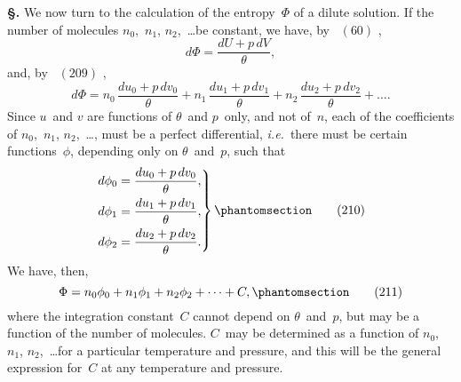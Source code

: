 \documentclass[12pt]{book}[2005/09/16]
\newcommand{\Chg}[2]{#2}
\newcommand{\Add}[1]{\Chg{}{#1}}
\newcommand{\Section}[1]{
  \medskip\par\textbf{§\;#1}
  \label{section:#1}
}
\newcommand{\Tag}[1]{%
  \phantomsection\label{eqn:#1}\tag*{\ensuremath{#1}}%
}
\newcommand{\Eq}[1]{%
  \hyperref[eqn:#1]{\ensuremath{#1}}%
}
\newcommand{\PageSep}[1]{\ignorespaces}
\newcommand{\ie}{\emph{i.e.}}
\begin{document}
\Section{254.} We now turn to the calculation of the entropy~$\Phi$
%
of a dilute solution. If the number of molecules $n_{0}$,~$n_{1}$,
$n_{2}$,~\dots be constant, we have, by~\Eq{(60)},
\[
d\Phi = \frac{dU + p\, dV}{\theta},
\]
and, by~\Eq{(209)},
\[
d\Phi = n_{0}\, \frac{du_{0} + p\, dv_{0}}{\theta}
  + n_{1}\, \frac{du_{1} + p\, dv_{1}}{\theta}
  + n_{2}\, \frac{du_{2} + p\, dv_{2}}{\theta} + \dots\Add{.}
\]
Since $u$~and $v$ are functions of $\theta$~and $p$~only, and not of~$n$,
each of the coefficients of $n_{0}$,~$n_{1}$, $n_{2}$,~\dots, must be a perfect
differential, \ie\ there must be certain functions~$\phi$, depending
only on $\theta$~and~$p$, such that
\[
\left.
\begin{aligned}
d\phi_{0} &= \frac{du_{0} + p\, dv_{0}}{\theta}\Add{,} \\
d\phi_{1} &= \frac{du_{1} + p\, dv_{1}}{\theta}\Add{,} \\
d\phi_{2} &= \frac{du_{2} + p\, dv_{2}}{\theta}\Add{.}
\end{aligned}
\right\}
\Tag{(210)}
\]
\PageSep{227}
We have, then,
\[
\Phi = n_{0} \phi_{0} + n_{1} \phi_{1} + n_{2} \phi_{2} + \dots + C,
\Tag{(211)}
\]
where the integration constant~$C$ cannot depend on $\theta$~and~$p$,
but may be a function of the number of molecules. $C$~may
be determined as a function of $n_{0}$,~$n_{1}$, $n_{2}$,~\dots for a particular
temperature and pressure, and this will be the general expression
for~$C$ at any temperature and pressure.
\end{document}
